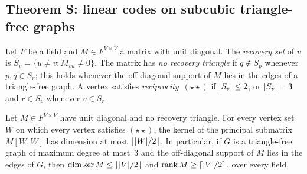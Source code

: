 \subsection{Theorem S: linear codes on subcubic triangle-free graphs}\label{sec:subcubic}

Let $F$ be a field and $M\in F^{V\times V}$ a matrix with unit diagonal. The \emph{recovery set} of $v$ is
$S_v=\{u\ne v: M_{vu}\ne0\}$. The matrix has \emph{no recovery triangle} if $q\notin S_p$ whenever $p,q\in S_r$; this
holds whenever the off-diagonal support of $M$ lies in the edges of a triangle-free graph. A vertex satisfies
\emph{reciprocity}~$(\star\star)$ if $\lvert S_v \rvert\le2$, or $\lvert S_v \rvert=3$ and $r\in S_v$ whenever $v\in S_r$.

\begin{theorem}[Theorem S]\label{thm:S}
Let $M\in F^{V\times V}$ have unit diagonal and no recovery triangle. For every vertex set $W$ on which every vertex
satisfies $(\star\star)$, the kernel of the principal submatrix $M[W,W]$ has dimension at most $\lfloor\lvert W \rvert/2\rfloor$.
In particular, if $G$ is a triangle-free graph of maximum degree at most~$3$ and the off-diagonal support of $M$ lies in
the edges of $G$, then $\dim\ker M\le\lfloor\lvert V \rvert/2\rfloor$ and $\operatorname{rank} M\ge\lceil\lvert V \rvert/2\rceil$, over every field.
\end{theorem}

